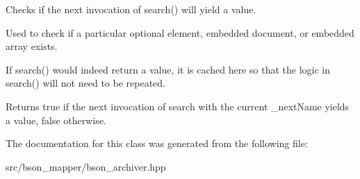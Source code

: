 Checks if the next invocation of search() will yield a value. 

Used to check if a particular optional element, embedded document, or embedded array exists.

If search() would indeed return a value, it is cached here so that the logic in search() will not need to be repeated.

\begin{DoxyReturn}{Returns}
true if the next invocation of search with the current \+\_\+next\+Name yields a value, false otherwise. 
\end{DoxyReturn}


The documentation for this class was generated from the following file\+:\begin{DoxyCompactItemize}
\item 
src/bson\+\_\+mapper/bson\+\_\+archiver.\+hpp\end{DoxyCompactItemize}

